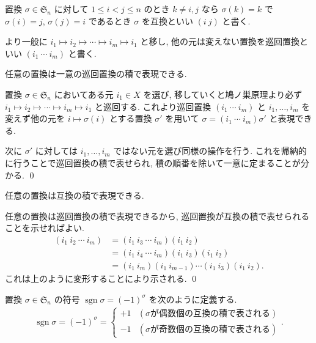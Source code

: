 \documentclass[uplatex,dvipdfmx,a4paper,11pt]{jlreq}
\makeatletter
\DeclareMathOperator{\sgn}{sgn}
\renewcommand{\SS}{\mathfrak{S}}
\numberwithin{equation}{section}
\theoremstyle{definition}
\renewenvironment{proof}[1][\proofname]{\par
  \normalfont
  \topsep6\p@\@plus6\p@ \trivlist
  \item[\hskip\labelsep{\bfseries #1}\@addpunct{\bfseries}]\ignorespaces\quad\par
}{%
  \qed\endtrivlist\@endpefalse
}
\renewcommand\proofname{証明}
\makeatother
\begin{document}
\begin{definition}[互換, 巡回置換]
  置換 $\sigma\in\SS_n$ に対して $1\leq i < j\leq n$ のとき $k \neq i,j$ なら $\sigma(k) = k$ で $\sigma(i) = j$, $\sigma(j) = i$ であるとき $\sigma$ を互換といい $(i\ j)$ と書く.

  より一般に $i_1\mapsto i_2\mapsto\cdots\mapsto i_m\mapsto i_1$ と移し, 他の元は変えない置換を巡回置換といい $(i_1\ \cdots\ i_m)$ と書く.
\end{definition}

\begin{lemma}
  任意の置換は一意の巡回置換の積で表現できる.
\end{lemma}
\begin{proof}
  置換 $\sigma\in\SS_n$ においてある元 $i_1\in X$ を選び, 移していくと鳩ノ巣原理より必ず $i_1\mapsto i_2\mapsto\cdots\mapsto i_m\mapsto i_1$ と巡回する. これより巡回置換 $(i_1\ \cdots\ i_m)$ と $i_1,\ldots,i_m$ を変えず他の元を $i\mapsto\sigma(i)$ とする置換 $\sigma'$ を用いて $\sigma = (i_1\ \cdots\ i_m)\sigma'$ と表現できる.

  次に $\sigma'$ に対しては $i_1,\ldots,i_m$ ではない元を選び同様の操作を行う. これを帰納的に行うことで巡回置換の積で表せられ, 積の順番を除いて一意に定まることが分かる.
\end{proof}

\begin{theorem}[Q21-7(i)]
  任意の置換は互換の積で表現できる.
\end{theorem}
\begin{proof}
  任意の置換は巡回置換の積で表現できるから, 巡回置換が互換の積で表せられることを示せればよい.
  \begin{align}
    (i_1\ i_2\ \cdots\ i_m) & = (i_1\ i_3\ \cdots\ i_m)(i_1\ i_2)                   \\
                            & = (i_1\ i_4\ \cdots\ i_m)(i_1\ i_3)(i_1\ i_2)         \\
                            & = (i_1\ i_m)(i_1\ i_{m-1})\cdots(i_1\ i_3)(i_1\ i_2).
  \end{align}
  これは上のように変形することにより示される.
\end{proof}

\begin{definition}[符号]
  置換 $\sigma\in\SS_n$ の符号 $\sgn\sigma = (-1)^\sigma$ を次のように定義する.
  \begin{align}
    \sgn\sigma = (-1)^\sigma = \begin{cases}
                                 +1 & (\sigma が偶数個の互換の積で表される) \\
                                 -1 & (\sigma が奇数個の互換の積で表される)
                               \end{cases}.
  \end{align}
\end{definition}
\end{document}
